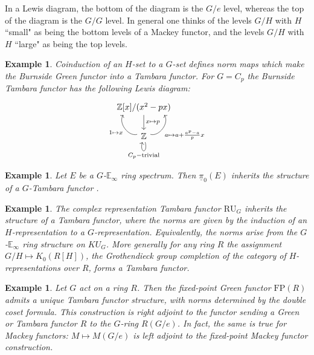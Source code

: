 \documentclass[11pt,dvipsnames]{amsart}
\newcommand{\Z}{\mathbb{Z}}
\theoremstyle{BoldRemark}
\newtheorem{example}[theorem]{Example}
\newcommand{\FP}{\mathrm{FP}}
\begin{document}
In a Lewis diagram, the bottom of the diagram is the $G/e$ level, whereas the top of the diagram is the $G/G$ level. In general one thinks of the levels $G/H$ with $H$ ``small" as being the bottom levels of a Mackey functor, and the levels $G/H$ with $H$ ``large" as being the top levels.

\begin{example}\label{ex:Burnside-Tamb-functor}
	Coinduction of an $H$-set to a $G$-set defines norm maps which make the Burnside Green functor into a Tambara functor. For $G = C_p$ the Burnside Tambara functor has the following Lewis diagram:
    \[ \begin{tikzcd}
        \Z[x]/(x^2-px) \arrow[d, "x \mapsto p"] \\
        \Z \arrow[u, bend left = 70, "1 \mapsto x"] \arrow[u, bend right = 70, swap, "a \mapsto a+\frac{a^p-a}{p}x"] \arrow[loop below, "C_p-\mathrm{trivial}"]
    \end{tikzcd} \]
\end{example}

\begin{example}\label{ex:G-E_oo-gives-Tamb-functor}
	Let $E$ be a $G$-$\mathbb{E}_\infty$ ring spectrum. Then $\underline{\pi}_0(E)$ inherits the structure of a $G$-Tambara functor \cite{Bru07}.
\end{example}

\begin{example}\label{ex:representation-Tamb-functor}
	The complex representation Tambara functor $\mathrm{RU}_G$ inherits the structure of a Tambara functor, where the norms are given by the induction of an $H$-representation to a $G$-representation. Equivalently, the norms arise from the $G$-$\mathbb{E}_\infty$ ring structure on $KU_G$. More generally for any ring $R$ the assignment $G/H \mapsto K_0(R[H])$, the Grothendieck group completion of the category of $H$-representations over $R$, forms a Tambara functor.
\end{example}

\begin{example}
	Let $G$ act on a ring $R$. Then the fixed-point Green functor $\FP (R)$ admits a unique Tambara functor structure, with norms determined by the double coset formula. This construction is right adjoint to the functor sending a Green or Tambara functor $R$ to the $G$-ring $R(G/e)$. In fact, the same is true for Mackey functors: $M \mapsto M(G/e)$ is left adjoint to the fixed-point Mackey functor construction.
\end{example}
\end{document}
